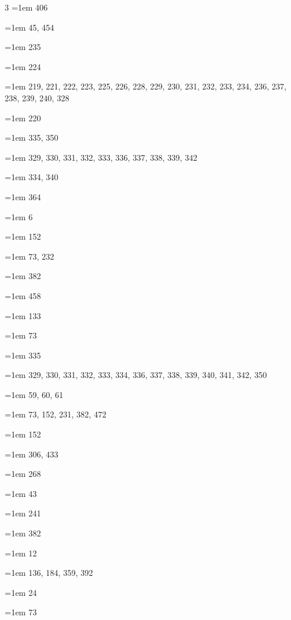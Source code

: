 \begin{multicols}{3}
\hangindent=1em  406\par
\hangindent=1em  45, 454\par
\hangindent=1em  235\par
\hangindent=1em  224\par
\hangindent=1em  219, 221, 222, 223, 225, 226, 228, 229, 230, 231, 232, 233, 234, 236, 237, 238, 239, 240, 328\par
\hangindent=1em  220\par
\hangindent=1em  335, 350\par
\hangindent=1em  329, 330, 331, 332, 333, 336, 337, 338, 339, 342\par
\hangindent=1em  334, 340\par
\hangindent=1em  364\par
\hangindent=1em  6\par
\hangindent=1em  152\par
\hangindent=1em  73, 232\par
\hangindent=1em  382\par
\hangindent=1em  458\par
\hangindent=1em  133\par
\hangindent=1em  73\par
\hangindent=1em  335\par
\hangindent=1em  329, 330, 331, 332, 333, 334, 336, 337, 338, 339, 340, 341, 342, 350\par
\hangindent=1em  59, 60, 61\par
\hangindent=1em  73, 152, 231, 382, 472\par
\hangindent=1em  152\par
\hangindent=1em  306, 433\par
\hangindent=1em  268\par
\hangindent=1em  43\par
\hangindent=1em  241\par
\hangindent=1em  382\par
\hangindent=1em  12\par
\hangindent=1em  136, 184, 359, 392\par
\hangindent=1em  24\par
\hangindent=1em  73\par

\end{multicols}
